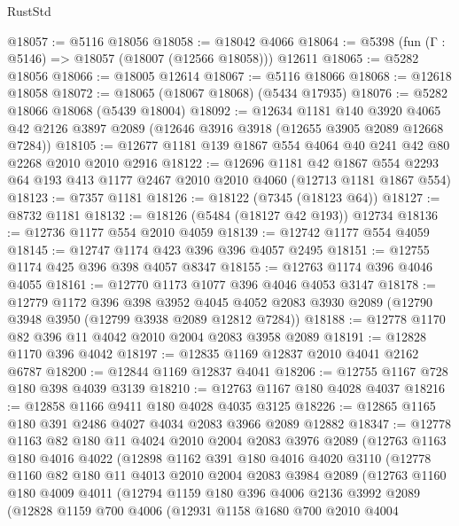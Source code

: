 \begin{lexlean}{RustStd}
\begin{coremodule}
@18057 := @5116 @18056
@18058 := @18042 @4066
@18064 := @5398 (fun (Γ : @5146) => @18057 (@18007 (@12566 @18058))) @12611
@18065 := @5282 @18056
@18066 := @18005 @12614
@18067 := @5116 @18066
@18068 := @12618 @18058
@18072 := @18065 (@18067 @18068) (@5434 @17935)
@18076 := @5282 @18066 @18068 (@5439 @18004)
@18092 := @12634
    @1181
    @140
    @3920
    @4065
    @42
    @2126
    @3897
    @2089
    (@12646 @3916 @3918 (@12655 @3905 @2089 @12668 @7284))
@18105 := @12677 @1181 @139 @1867 @554 @4064 @40 @241 @42 @80 @2268 @2010 @2010 @2916
@18122 := @12696
    @1181
    @42
    @1867
    @554
    @2293
    @64
    @193
    @413
    @1177
    @2467
    @2010
    @2010
    @4060
    (@12713 @1181 @1867 @554)
@18123 := @7357 @1181
@18126 := @18122 (@7345 (@18123 @64))
@18127 := @8732 @1181
@18132 := @18126 (@5484 (@18127 @42 @193)) @12734
@18136 := @12736 @1177 @554 @2010 @4059
@18139 := @12742 @1177 @554 @4059
@18145 := @12747 @1174 @423 @396 @396 @4057 @2495
@18151 := @12755 @1174 @425 @396 @398 @4057 @8347
@18155 := @12763 @1174 @396 @4046 @4055
@18161 := @12770 @1173 @1077 @396 @4046 @4053 @3147
@18178 := @12779
    @1172
    @396
    @398
    @3952
    @4045
    @4052
    @2083
    @3930
    @2089
    (@12790 @3948 @3950 (@12799 @3938 @2089 @12812 @7284))
@18188 := @12778 @1170 @82 @396 @11 @4042 @2010 @2004 @2083 @3958 @2089
@18191 := @12828 @1170 @396 @4042
@18197 := @12835 @1169 @12837 @2010 @4041 @2162 @6787
@18200 := @12844 @1169 @12837 @4041
@18206 := @12755 @1167 @728 @180 @398 @4039 @3139
@18210 := @12763 @1167 @180 @4028 @4037
@18216 := @12858 @1166 @9411 @180 @4028 @4035 @3125
@18226 := @12865 @1165 @180 @391 @2486 @4027 @4034 @2083 @3966 @2089 @12882
@18347 := @12778
    @1163
    @82
    @180
    @11
    @4024
    @2010
    @2004
    @2083
    @3976
    @2089
    (@12763
      @1163
      @180
      @4016
      @4022
      (@12898
        @1162
        @391
        @180
        @4016
        @4020
        @3110
        (@12778
          @1160
          @82
          @180
          @11
          @4013
          @2010
          @2004
          @2083
          @3984
          @2089
          (@12763
            @1160
            @180
            @4009
            @4011
            (@12794
              @1159
              @180
              @396
              @4006
              @2136
              @3992
              @2089
              (@12828
                @1159
                @700
                @4006
                (@12931
                  @1158
                  @1680
                  @700
                  @2010
                  @4004

\end{coremodule}
\end{lexlean}
